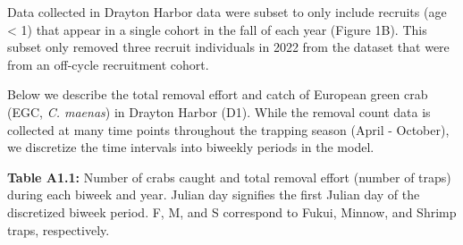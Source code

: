 \documentclass[
]{article}
\begin{document}
Data collected in Drayton Harbor data were subset to only include
recruits (age \textless{} 1) that appear in a single cohort in the fall
of each year (Figure 1B). This subset only removed three recruit
individuals in 2022 from the dataset that were from an off-cycle
recruitment cohort.

Below we describe the total removal effort and catch of European green
crab (EGC, \emph{C. maenas}) in Drayton Harbor (D1). While the removal
count data is collected at many time points throughout the trapping
season (April - October), we discretize the time intervals into biweekly
periods in the model.

\newpage

\textbf{Table A1.1:} Number of crabs caught and total removal effort
(number of traps) during each biweek and year. Julian day signifies the
first Julian day of the discretized biweek period. F, M, and S
correspond to Fukui, Minnow, and Shrimp traps, respectively.
\end{document}
